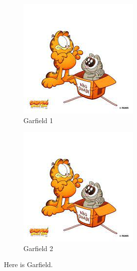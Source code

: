 \documentclass{article}
\theoremstyle{definition}
\theoremstyle{remark}
\begin{document}
\begin{figure}[htbp]
\centering

\begin{subfigure}{0.3\linewidth}
\includegraphics[width=\linewidth]{download.jpg}
\caption{Garfield 1}\label{subfig:1}
\end{subfigure} \hspace{10 em}
\begin{subfigure}{0.3\linewidth}
\includegraphics[width=\linewidth]{download.jpg}
\caption{Garfield 2}\label{subfig:2}
\end{subfigure}

\caption{Here is Garfield.}\label{fig:G}
\end{figure}
\end{document}

